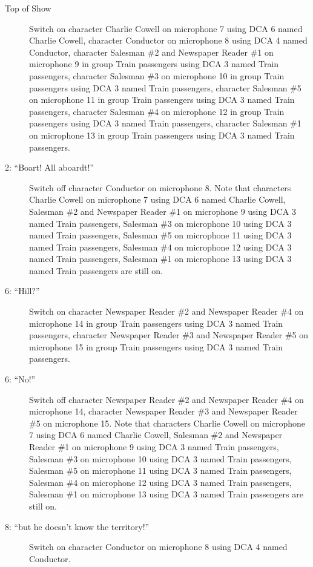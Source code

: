 \begin{description}
\item[Top of Show]
Switch on character Charlie Cowell on microphone 7 using DCA 6 named Charlie Cowell, character Conductor on microphone 8 using DCA 4 named Conductor, character Salesman \#2 and Newspaper Reader \#1 on microphone 9 in group Train passengers using DCA 3 named Train passengers, character Salesman \#3 on microphone 10 in group Train passengers using DCA 3 named Train passengers, character Salesman \#5 on microphone 11 in group Train passengers using DCA 3 named Train passengers, character Salesman \#4 on microphone 12 in group Train passengers using DCA 3 named Train passengers, character Salesman \#1 on microphone 13 in group Train passengers using DCA 3 named Train passengers. 

\item[2: ``Boart!  All aboardt!'']
Switch off character Conductor on microphone 8. Note that characters Charlie Cowell on microphone 7 using DCA 6 named Charlie Cowell, Salesman \#2 and Newspaper Reader \#1 on microphone 9 using DCA 3 named Train passengers, Salesman \#3 on microphone 10 using DCA 3 named Train passengers, Salesman \#5 on microphone 11 using DCA 3 named Train passengers, Salesman \#4 on microphone 12 using DCA 3 named Train passengers, Salesman \#1 on microphone 13 using DCA 3 named Train passengers are still on.  

\item[6: ``Hill?'']
Switch on character Newspaper Reader \#2 and Newspaper Reader \#4 on microphone 14 in group Train passengers using DCA 3 named Train passengers, character Newspaper Reader \#3 and Newspaper Reader \#5 on microphone 15 in group Train passengers using DCA 3 named Train passengers. 

\item[6: ``No!'']
Switch off character Newspaper Reader \#2 and Newspaper Reader \#4 on microphone 14, character Newspaper Reader \#3 and Newspaper Reader \#5 on microphone 15. Note that characters Charlie Cowell on microphone 7 using DCA 6 named Charlie Cowell, Salesman \#2 and Newspaper Reader \#1 on microphone 9 using DCA 3 named Train passengers, Salesman \#3 on microphone 10 using DCA 3 named Train passengers, Salesman \#5 on microphone 11 using DCA 3 named Train passengers, Salesman \#4 on microphone 12 using DCA 3 named Train passengers, Salesman \#1 on microphone 13 using DCA 3 named Train passengers are still on.  

\item[8: ``but he doesn't know the territory!'']
Switch on character Conductor on microphone 8 using DCA 4 named Conductor. 


\end{description}
